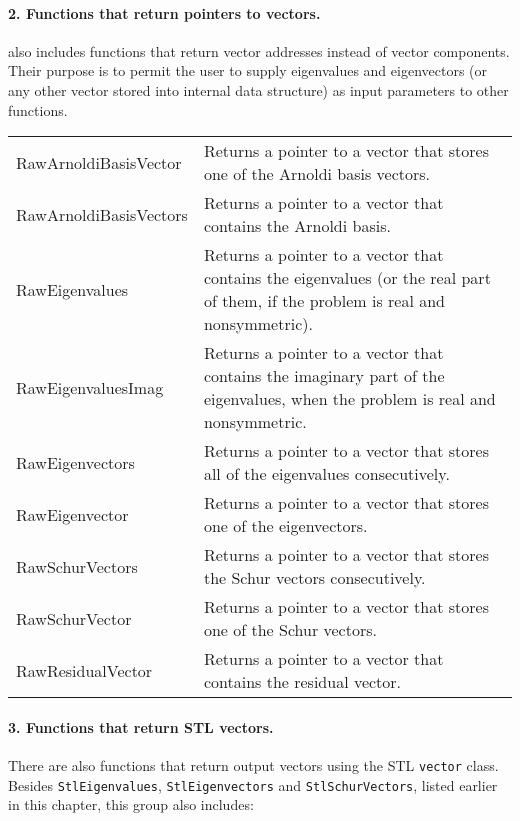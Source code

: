 \paragraph{2. Functions that return pointers to vectors.}

\ARPP{} also includes functions that return vector addresses instead of vector components. Their purpose is to permit the user to supply eigenvalues and eigenvectors (or any other vector stored into \ARPP{} internal data structure) as input parameters to other functions. 

\begin{tabularx}{\textwidth}{LX}
	RawArnoldiBasisVector & Returns a pointer to a vector that stores one of the Arnoldi basis vectors.\\
	RawArnoldiBasisVectors & Returns a pointer to a vector that contains the Arnoldi basis.\\
	RawEigenvalues & Returns a pointer to a vector that contains the eigenvalues (or the real part of them, if the problem is real and nonsymmetric).\\
	RawEigenvaluesImag & Returns a pointer to a vector that contains the imaginary part of the eigenvalues, when the problem is real and nonsymmetric.\\
	RawEigenvectors & Returns a pointer to a vector that stores all of the eigenvalues consecutively.\\
	RawEigenvector & Returns a pointer to a vector that stores one of the eigenvectors.\\
	RawSchurVectors & Returns a pointer to a vector that stores the Schur vectors consecutively.\\
	RawSchurVector & Returns a pointer to a vector that stores one of the Schur vectors.\\
	RawResidualVector & Returns a pointer to a vector that contains the residual vector.\\
\end{tabularx}

\paragraph{3. Functions that return STL vectors.}

There are also functions that return output vectors using the STL \texttt{vector} class. Besides \texttt{StlEigenvalues}, \texttt{StlEigenvectors} and \texttt{StlSchurVectors}, listed earlier in this chapter, this group also includes:

